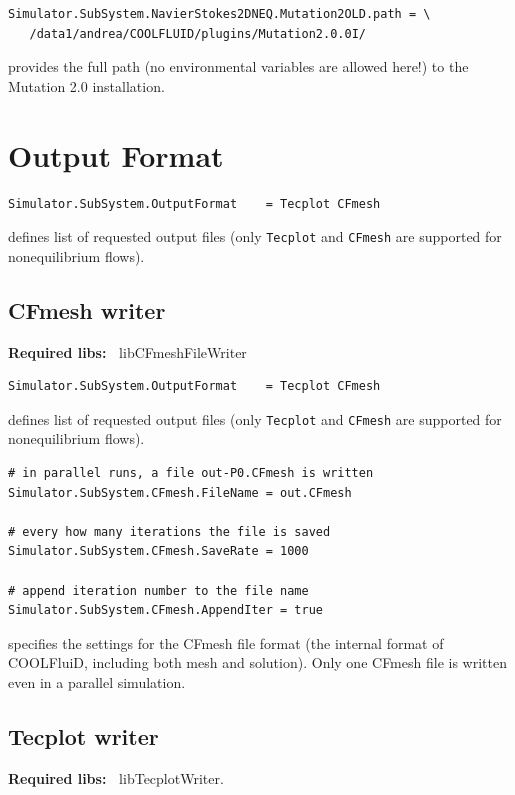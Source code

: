 \documentclass[11pt]{article}
\begin{document}
\begin{lstlisting}[breaklines]
Simulator.SubSystem.NavierStokes2DNEQ.Mutation2OLD.path = \
   /data1/andrea/COOLFLUID/plugins/Mutation2.0.0I/
\end{lstlisting}
provides the full path (no environmental variables are allowed here!) to the Mutation 2.0 installation.

\section{Output Format}

\begin{lstlisting}[breaklines]
Simulator.SubSystem.OutputFormat    = Tecplot CFmesh
\end{lstlisting}
defines list of requested output files (only {\tt Tecplot} and {\tt CFmesh} are supported for nonequilibrium flows).

\subsection{CFmesh writer}

{\bf Required libs:~} libCFmeshFileWriter
           
\begin{lstlisting}[breaklines]
Simulator.SubSystem.OutputFormat    = Tecplot CFmesh
\end{lstlisting}
defines list of requested output files (only {\tt Tecplot} and {\tt CFmesh} are supported for nonequilibrium flows).

\begin{lstlisting}[breaklines]
# in parallel runs, a file out-P0.CFmesh is written
Simulator.SubSystem.CFmesh.FileName = out.CFmesh  

# every how many iterations the file is saved  
Simulator.SubSystem.CFmesh.SaveRate = 1000

# append iteration number to the file name  	
Simulator.SubSystem.CFmesh.AppendIter = true
\end{lstlisting}
specifies the settings for the CFmesh file format (the internal format of COOLFluiD, including both mesh and solution).
Only one CFmesh file is written even in a parallel simulation. 

\subsection{Tecplot writer}

{\bf Required libs:~} libTecplotWriter.
        
\end{document}
